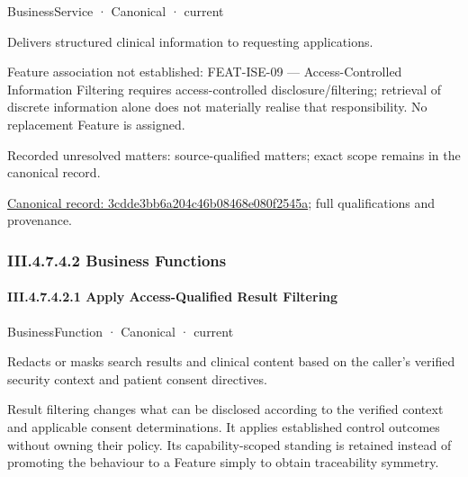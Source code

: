 \label{element:3cdde3bb6a204c46b08468e080f2545a}
{\small BusinessService · Canonical · current}\par

Delivers structured clinical information to requesting applications.



Feature association not established: FEAT-ISE-09 — Access-Controlled Information Filtering requires access-controlled disclosure/filtering; retrieval of discrete information alone does not materially realise that responsibility. No replacement Feature is assigned.


{\small Recorded unresolved matters: source-qualified matters; exact scope remains in the canonical record.}\par
{\footnotesize \href{../../../../../../../continuum/business/business-service/3cdde3bb6a204c46b08468e080f2545a.md}{Canonical record: 3cdde3bb6a204c46b08468e080f2545a}; full qualifications and provenance.}\par
\subsubsection*{III.4.7.4.2 Business Functions}
\label{navigation:III.4.7.4.2}

\paragraph*{III.4.7.4.2.1 Apply Access-Qualified Result Filtering}
\label{navigation:III.4.7.4.2.1}

\label{element:598e46ab52644e70809b3039b7a4c21e}
{\small BusinessFunction · Canonical · current}\par

Redacts or masks search results and clinical content based on the caller's verified security context and patient consent directives.



Result filtering changes what can be disclosed according to the verified context and applicable consent determinations. It applies established control outcomes without owning their policy. Its capability-scoped standing is retained instead of promoting the behaviour to a Feature simply to obtain traceability symmetry.


